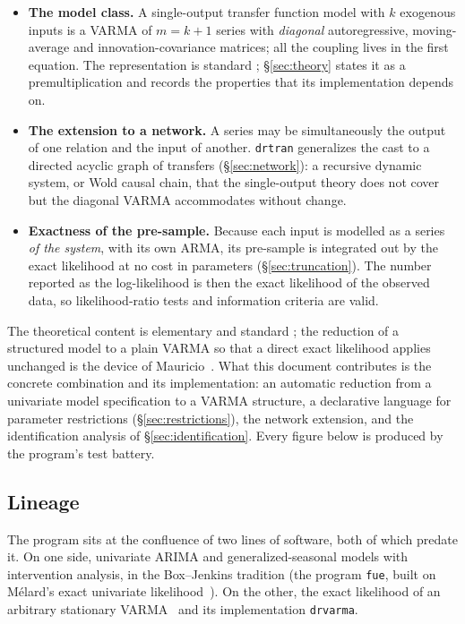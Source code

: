 \documentclass[11pt,a4paper]{article}
\theoremstyle{plain}
\theoremstyle{remark}
\begin{document}
\begin{itemize}
\item \textbf{The model class.} A single-output transfer function model with $k$
  exogenous inputs is a VARMA of $m=k+1$ series with \emph{diagonal}
  autoregressive, moving-average and innovation-covariance matrices; all the
  coupling lives in the first equation. The representation is standard
  \cite{tiaobox1981,reinsel1997,lutkepohl2005}; \S\ref{sec:theory} states it as a
  premultiplication and records the properties that its implementation depends
  on.

\item \textbf{The extension to a network.} A series may be simultaneously the
  output of one relation and the input of another. \texttt{drtran} generalizes
  the cast to a directed acyclic graph of transfers (\S\ref{sec:network}): a
  recursive dynamic system, or Wold causal chain, that the single-output theory
  does not cover but the diagonal VARMA accommodates without change.

\item \textbf{Exactness of the pre-sample.} Because each input is modelled as a
  series \emph{of the system}, with its own ARMA, its pre-sample is integrated
  out by the exact likelihood at no cost in parameters (\S\ref{sec:truncation}).
  The number reported as the log-likelihood is then the exact likelihood of the
  observed data, so likelihood-ratio tests and information criteria are valid.
\end{itemize}

\noindent
The theoretical content is elementary and standard \cite{lutkepohl2005,
reinsel1997, gomez2019}; the reduction of a structured model to a plain VARMA so
that a direct exact likelihood applies unchanged is the device of
Mauricio~\cite{mauricio2006}. What this document contributes is the concrete
combination and its implementation: an automatic reduction from a univariate
model specification to a VARMA structure, a declarative language for parameter
restrictions (\S\ref{sec:restrictions}), the network extension, and the
identification analysis of \S\ref{sec:identification}. Every figure below is
produced by the program's test battery.

\subsection{Lineage}

The program sits at the confluence of two lines of software, both of which
predate it. On one side, univariate ARIMA and generalized-seasonal models with
intervention analysis, in the Box--Jenkins tradition (the program \texttt{fue},
built on M\'elard's exact univariate likelihood~\cite{melard1984}). On the
other, the exact likelihood of an arbitrary stationary
VARMA~\cite{mauricio1995,mauricio1997} and its implementation \texttt{drvarma}.
\end{document}
